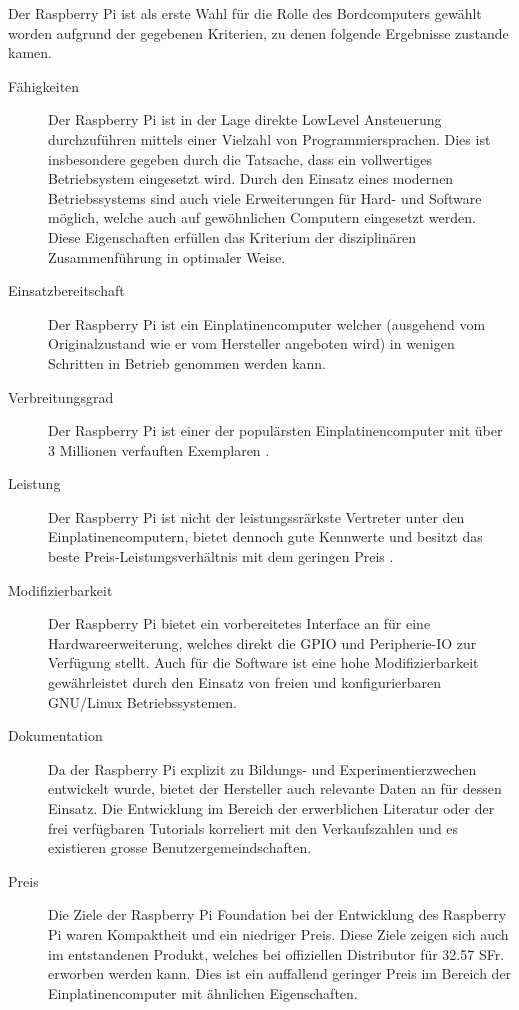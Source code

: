 Der Raspberry Pi ist als erste Wahl für die Rolle des Bordcomputers 
gewählt worden aufgrund der gegebenen Kriterien, zu denen folgende 
Ergebnisse zustande kamen.

\begin{description}
	\item[Fähigkeiten] Der Raspberry Pi ist in der Lage direkte
		LowLevel Ansteuerung durchzuführen mittels einer Vielzahl
		von Programmiersprachen. Dies ist insbesondere gegeben
		durch die Tatsache, dass ein vollwertiges Betriebsystem
		eingesetzt wird. Durch den Einsatz eines modernen
		Betriebssystems sind auch viele Erweiterungen für Hard- 
		und Software möglich, welche auch auf gewöhnlichen 
		Computern eingesetzt werden. Diese Eigenschaften erfüllen
		das Kriterium der disziplinären Zusammenführung in 
		optimaler Weise.
	\item[Einsatzbereitschaft] Der Raspberry Pi ist ein 
		Einplatinencomputer welcher (ausgehend vom Originalzustand
		wie er vom Hersteller angeboten wird) in wenigen Schritten 
		in Betrieb genommen werden kann. 
	\item[Verbreitungsgrad] Der Raspberry Pi ist einer der
		populärsten Einplatinencomputer mit über 3 Millionen
		verfauften Exemplaren \cite{liz}.
	\item[Leistung] Der Raspberry Pi ist nicht der leistungssrärkste
		Vertreter unter den Einplatinencomputern, bietet dennoch
		gute Kennwerte und besitzt das beste
		Preis-Leistungsverhältnis mit dem geringen Preis \cite{elv}.
	\item[Modifizierbarkeit] Der Raspberry Pi bietet ein vorbereitetes
		Interface an für eine Hardwareerweiterung, welches direkt
		die GPIO und Peripherie-IO zur Verfügung stellt. Auch
		für die Software ist eine hohe Modifizierbarkeit 
		gewährleistet durch den Einsatz von freien und 
		konfigurierbaren GNU/Linux Betriebssystemen.
	\item[Dokumentation] Da der Raspberry Pi explizit zu 
		Bildungs- und Experimentierzwechen entwickelt wurde, 
		bietet der Hersteller auch relevante Daten an für dessen
		Einsatz. Die Entwicklung im Bereich der
		erwerblichen Literatur oder der frei verfügbaren
		Tutorials korreliert mit den Verkaufszahlen und es 
		existieren grosse Benutzergemeindschaften.
	\item[Preis] Die Ziele der Raspberry Pi Foundation bei der
		Entwicklung des Raspberry Pi waren Kompaktheit und ein 
		niedriger Preis. Diese Ziele zeigen sich auch im
		entstandenen Produkt, welches bei offiziellen Distributor
		für 32.57 SFr. erworben werden kann. Dies ist ein 
		auffallend geringer Preis im Bereich der 
		Einplatinencomputer mit ähnlichen Eigenschaften.
\end{description}

